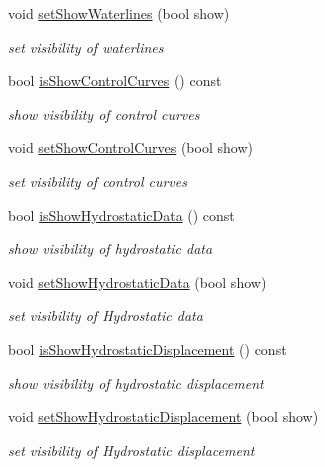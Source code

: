 \begin{DoxyCompactItemize}
void \hyperlink{classShipCAD_1_1Visibility_ac07b5944afd8a44c569aef09ee893450}{set\+Show\+Waterlines} (bool show)
\begin{DoxyCompactList}\small\item\em set visibility of waterlines \end{DoxyCompactList}\item 
bool \hyperlink{classShipCAD_1_1Visibility_adf96eb2133086a34056f6c0f75556f13}{is\+Show\+Control\+Curves} () const 
\begin{DoxyCompactList}\small\item\em show visibility of control curves \end{DoxyCompactList}\item 
void \hyperlink{classShipCAD_1_1Visibility_a760ef76f6db721925ee95cefaae966de}{set\+Show\+Control\+Curves} (bool show)
\begin{DoxyCompactList}\small\item\em set visibility of control curves \end{DoxyCompactList}\item 
bool \hyperlink{classShipCAD_1_1Visibility_a7f3f2b2f3dd7ddb554464969562c76ec}{is\+Show\+Hydrostatic\+Data} () const 
\begin{DoxyCompactList}\small\item\em show visibility of hydrostatic data \end{DoxyCompactList}\item 
void \hyperlink{classShipCAD_1_1Visibility_a67c7c1987fcd221ab15b2353bdb22d49}{set\+Show\+Hydrostatic\+Data} (bool show)
\begin{DoxyCompactList}\small\item\em set visibility of Hydrostatic data \end{DoxyCompactList}\item 
bool \hyperlink{classShipCAD_1_1Visibility_a8605852bf4a1967b83c8e74c62598214}{is\+Show\+Hydrostatic\+Displacement} () const 
\begin{DoxyCompactList}\small\item\em show visibility of hydrostatic displacement \end{DoxyCompactList}\item 
void \hyperlink{classShipCAD_1_1Visibility_ac4cdc562cf2f811386c4924e526acbab}{set\+Show\+Hydrostatic\+Displacement} (bool show)
\begin{DoxyCompactList}\small\item\em set visibility of Hydrostatic displacement \end{DoxyCompactList}\item 

\end{DoxyCompactItemize}
